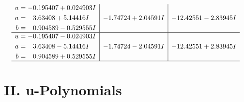 \documentclass[1p]{elsarticle_modified}
\theoremstyle{definition}
\begin{document}
$$\begin{array}{c|c|c}
\begin{aligned}
u &= -0.195407 + 0.024903 I \\
a &= \phantom{-}3.63408 + 5.14416 I \\
b &= \phantom{-}0.904589 - 0.529555 I\end{aligned}
 & -1.74724 + 2.04591 I & -12.42551 - 2.83945 I \\ \hline\begin{aligned}
u &= -0.195407 - 0.024903 I \\
a &= \phantom{-}3.63408 - 5.14416 I \\
b &= \phantom{-}0.904589 + 0.529555 I\end{aligned}
 & -1.74724 - 2.04591 I & -12.42551 + 2.83945 I\\
 \hline 
 \end{array}$$\newpage
\newpage\renewcommand{\arraystretch}{1}
\centering \section*{ II. u-Polynomials}
\end{document}
